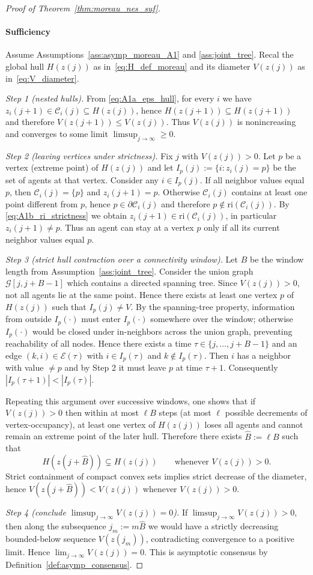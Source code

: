 \documentclass[12pt,draftcls,onecolumn]{IEEEtran}
\def\Cij{\mathcal{C}_i (j)}
\def\ri{\mathrm{ri}}
\begin{document}
\begin{proof}[Proof of Theorem~\ref{thm:moreau_nes_suf}]
\paragraph{Sufficiency}
Assume Assumptions~\ref{ass:asymp_moreau_A1} and \ref{ass:joint_tree}.
Recal the global hull $H(z(j))$ as in~\eqref{eq:H_def_moreau} and its diameter $V(z(j))$ as in~\eqref{eq:V_diameter}.

\emph{Step 1 (nested hulls).} From \eqref{eq:A1a_eps_hull}, for every $i$ we have
$z_i(j+1)\in \Cij\subseteq H(z(j))$, hence $H(z(j+1))\subseteq H(z(j+1))$ and therefore $V(z(j+1))\le V(z(j))$.
Thus $V(z(j))$ is nonincreasing and converges to some limit $\limsup_{j \to \infty} \geq 0$.

\emph{Step 2 (leaving vertices under strictness).} Fix $j$ with $V(z(j))>0$.
Let $p$ be a vertex (extreme point) of $H(z(j))$ and let $I_p(j):=\{i: z_i(j)=p\}$ be the set of agents at that
vertex. Consider any $i\in I_p(j)$.
If all neighbor values equal $p$, then $\Cij=\{p\}$ and $z_i(j+1)=p$.
Otherwise $\Cij$ contains at least one point different from $p$, hence $p\in \partial \Cij$
and therefore $p\notin \ri(\Cij)$. By \eqref{eq:A1b_ri_strictness} we obtain
$z_i(j+1)\in \ri(\Cij)$, in particular $z_i(j+1)\neq p$. Thus an agent can stay at a vertex $p$ only
if all its current neighbor values equal $p$.

\emph{Step 3 (strict hull contraction over a connectivity window).}
Let $B$ be the window length from Assumption~\ref{ass:joint_tree}. Consider the union graph
$\mathcal G[j,j+B-1]$ which contains a directed spanning tree. Since $V(z(j))>0$, not all agents lie at the same
point. Hence there exists at least one vertex $p$ of $H(z(j))$ such that $I_p(j)\neq V$.
By the spanning-tree property, information from outside $I_p(\cdot)$ must enter $I_p(\cdot)$ somewhere over the
window; otherwise $I_p(\cdot)$ would be closed under in-neighbors across the union graph, preventing reachability
of all nodes. Hence there exists a time $\tau\in\{j,\dots,j+B-1\}$ and an edge $(k,i)\in \mathcal E(\tau)$ with
$i\in I_p(\tau)$ and $k\notin I_p(\tau)$. Then $i$ has a neighbor with value $\neq p$ and by Step 2 it must leave
$p$ at time $\tau+1$. Consequently $|I_p(\tau+1)|<|I_p(\tau)|$.

Repeating this argument over successive windows, one shows that if $V(z(j))>0$ then within at most $\ell B$ steps
(at most $\ell$ possible decrements of vertex-occupancy), at least one vertex of $H(z(j))$ loses all agents and
cannot remain an extreme point of the later hull. Therefore there exists $\hat B:=\ell B$ such that
\[
H(z(j+\hat B))\subsetneq H(z(j))\qquad\text{whenever }V(z(j))>0.
\]
Strict containment of compact convex sets implies strict decrease of the diameter, hence
$V(z(j+\hat B))<V(z(j))$ whenever $V(z(j))>0$.

\emph{Step 4 (conclude $\limsup_{j \to \infty} V(z(j))=0$).}
If $\limsup_{j \to \infty} V(z(j))>0$, then along the subsequence $j_m:=m\hat B$ we would have a strictly decreasing bounded-below
sequence $V(z(j_m))$, contradicting convergence to a positive limit. Hence $\lim_{j\to\infty}V(z(j))=0$.
This is asymptotic consensus by Definition~\ref{def:asymp_consensus}.
\end{proof}
\end{document}
